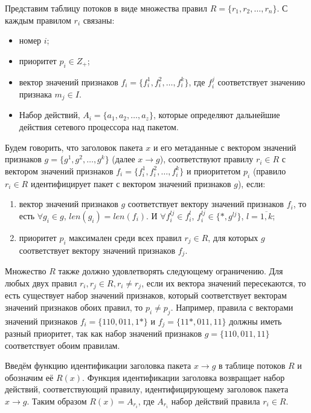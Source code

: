 \documentclass[oneside,final,12pt]{extarticle}
\begin{document}
        Представим таблицу потоков в виде множества правил \(R=\{r_1,r_2,\ldots,r_n\}\). С каждым правилом \(r_i\) связаны:
        \begin{itemize}
            \item номер \(i\);
            \item приоритет \(p_i\in Z_+\);
            \item вектор значений признаков \(f_i=\{f_i^1,f_i^2,\ldots,f_i^k\}\), где \(f_i^j\) соответствует значению признака \(m_j\in I\). %
            \item Набор действий, \(A_i = \{a_1, a_2, \ldots, a_z\} \), которые определяют дальнейшие действия сетевого процессора над пакетом.
        \end{itemize}

        Будем говорить, что заголовок пакета \(x\) и его метаданные с вектором значений признаков \(g=\{g^1,g^2,\ldots,g^k\}\) (далее \(x \rightarrow g\)),
        соответствуют правилу \(r_i\in R\) с вектором значений признаков \(f_i=\{f_i^1,f_i^2,\ldots,f_i^k\}\) 
        и приоритетом \(p_i\) (правило \(r_i\in R\) идентифицирует пакет с вектором значений признаков \(g\)), если:

        \begin{enumerate}
            \item вектор значений признаков \(g\) соответствует вектору значений признаков \(f_i\), 
                то есть \(\forall g_i \in g\), \(len(g_i) = len(f_i)\). И \(\forall f_i^{lj} \in f_i^l\), \(f_i^{lj} \in \{*, g^{lj}\}\), \(l=\overline{1,k}\);
            \item приоритет \(p_i\) максимален среди всех правил \(r_j\in R\), для которых \(g\) соответствует вектору значений признаков \(f_j\).
        \end{enumerate}

        Множество \(R\) также должно удовлетворять следующему ограничению. 
        Для любых двух правил \(r_i,r_j\in R,r_i\not= r_j\), если их вектора значений пересекаются, то есть существует набор значений признаков, 
        который соответствует векторам значений признаков обоих правил, то \(p_i\not= p_j\). 
        Например, правила с векторами значений признаков \(f_i=\{110, 011, 1*\}\) и \(f_j=\{11*, 011, 11\}\) должны иметь разный приоритет, 
        так как набор значений признаков \(g=\{110, 011, 11\}\) соответствует обоим правилам.
        
        Введём функцию идентификации заголовка пакета \(x \rightarrow g\) в таблице потоков \(R\) и обозначим её \(R(x)\).
        Функция идентификации заголовка возвращает набор действий, соответствующий правилу, идентифицирующему заголовок пакета \(x \rightarrow g\).
        Таким образом \(R(x) = A_{r_i}\), где \(A_{r_i}\) набор действий правила \(r_i \in R\).
\end{document}
